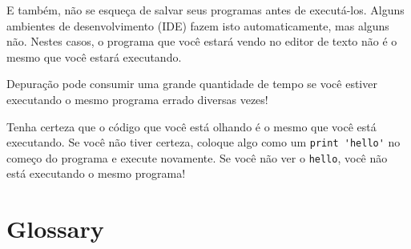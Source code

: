 E também, não se esqueça de salvar seus programas antes de executá-los.
Alguns ambientes de desenvolvimento (IDE) fazem isto automaticamente, mas
alguns não. Nestes casos, o programa que você estará vendo no editor de texto
não é o mesmo que você estará executando.


Depuração pode consumir uma grande quantidade de tempo se você estiver
executando o mesmo programa errado diversas vezes!


Tenha certeza que o código que você está olhando é o mesmo que você está
executando. Se você não tiver certeza, coloque algo como um \verb"print 'hello'"
no começo do programa e execute novamente. Se você não ver o \verb"hello",
você não está executando o mesmo programa!


\section{Glossary}

